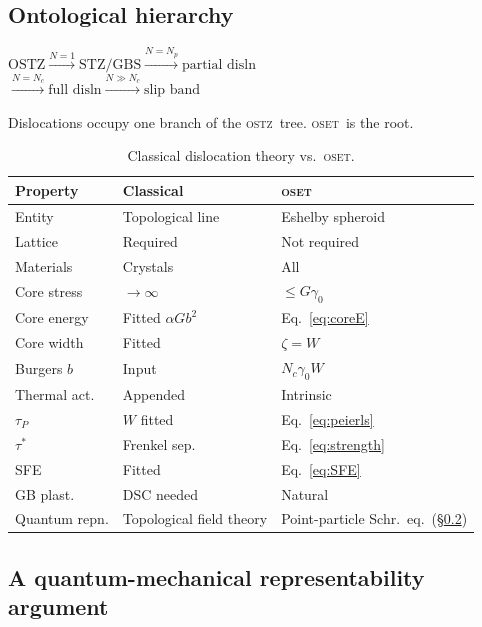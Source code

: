 \documentclass[5p,sort&compress]{elsarticle}
\newcommand{\OSTZ}{\textsc{ostz}}
\newcommand{\OSET}{\textsc{oset}}
\newcommand{\gz}{\gamma_0}
\begin{document}
\subsection{Ontological hierarchy}

\begin{center}
\small
$\text{OSTZ}
\xrightarrow{N=1}\text{STZ/GBS}
\xrightarrow{N=N_p}\text{partial disln}$\\[3pt]
$\xrightarrow{N=N_c}\text{full disln}
\xrightarrow{N\gg N_c}\text{slip band}$
\end{center}

Dislocations occupy one branch of the \OSTZ\ tree. \OSET\ is the root.

\begin{table}[htbp]
\centering
\small
\caption{Classical dislocation theory vs.\ \OSET.}
\label{tab:comparison}
\renewcommand{\arraystretch}{1.35}
\begin{tabular}{p{1.5cm}p{2.2cm}p{2.3cm}}
\toprule
Property & Classical & \OSET\\
\midrule
Entity & Topological line & Eshelby spheroid\\
Lattice & Required & Not required\\
Materials & Crystals & All\\
Core stress & $\to\infty$ & $\le G\gz$\\
Core energy & Fitted $\alpha Gb^2$ & Eq.~\eqref{eq:coreE}\\
Core width & Fitted & $\zeta=W$\\
Burgers $b$ & Input & $N_c\gz W$\\
Thermal act. & Appended & Intrinsic\\
$\tau_P$ & $W$ fitted & Eq.~\eqref{eq:peierls}\\
$\tau^*$ & Frenkel sep. & Eq.~\eqref{eq:strength}\\
SFE & Fitted & Eq.~\eqref{eq:SFE}\\
GB plast. & DSC needed & Natural\\
Quantum repn. & Topological field theory & Point-particle Schr.\ eq.\ (\S\ref{sec:quantum})\\
\bottomrule
\end{tabular}
\renewcommand{\arraystretch}{1}
\end{table}

\subsection{A quantum-mechanical representability argument}
\label{sec:quantum}
\end{document}
